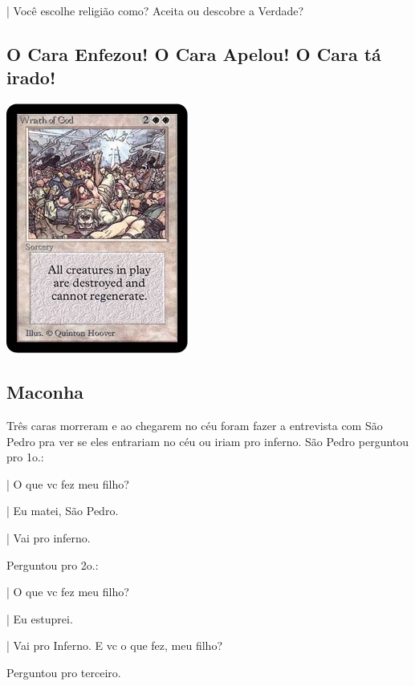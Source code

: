 \documentclass[12pt,a4paper]{article}
\begin{document}
			| Voc\^e escolhe religi\~ao como? Aceita ou descobre a Verdade\cite{x}?

		\subsection {O Cara Enfezou! O Cara Apelou! O Cara t\'a irado!}

			\begin{flushright}
			\end{flushright}

			\begin{center}
			\includegraphics{wrath}
			\end{center}

		\subsection {Maconha}

			\begin{flushright}
			\end{flushright}

Tr\^es caras morreram e ao chegarem no c\'eu foram fazer a entrevista com S\~ao Pedro pra ver se eles entrariam no c\'eu ou iriam pro inferno. S\~ao Pedro perguntou pro 1o.:

| O que vc fez meu filho?

| Eu matei, S\~ao Pedro.

| Vai pro inferno.

Perguntou pro 2o.:

| O que vc fez meu filho?

| Eu estuprei.

| Vai pro Inferno. E vc o que fez, meu filho?

Perguntou pro terceiro.
\end{document}

